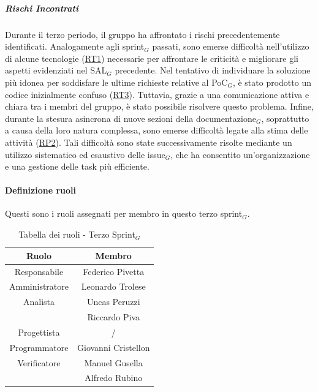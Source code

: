 \documentclass[10pt]{article}
\begin{document}
{{{{    \subparagraph*{Rischi Incontrati}\mbox{}

    Durante il terzo periodo, il gruppo ha affrontato i rischi precedentemente identificati. Analogamente agli sprint$_G$ passati, sono emerse difficoltà nell'utilizzo di alcune tecnologie (\hyperref[RT1]{RT1}) necessarie per affrontare le criticità e migliorare gli aspetti evidenziati nel SAL$_G$ precedente. Nel tentativo di individuare la soluzione più idonea per soddisfare le ultime richieste relative al PoC$_G$, è stato prodotto un codice inizialmente confuso (\hyperref[RT3]{RT3}). Tuttavia, grazie a una comunicazione attiva e chiara tra i membri del gruppo, è stato possibile risolvere questo problema.
    Infine, durante la stesura asincrona di nuove sezioni della documentazione$_G$, soprattutto a causa della loro natura complessa, sono emerse difficoltà legate alla stima delle attività (\hyperref[RP2]{RP2}). Tali difficoltà sono state successivamente risolte mediante un utilizzo sistematico ed esaustivo delle issue$_G$, che ha consentito un'organizzazione e una gestione delle task più efficiente.
    
    \paragraph{Definizione ruoli}\mbox{}\vspace{0.4em}
    
    Questi sono i ruoli assegnati per membro in questo terzo sprint$_G$.\\
    \begin{table}[H]
        \centering
        \begin{tabular}{|c|c|}
        \hline
        \rowcolor{gray!25}
        \textbf{Ruolo} & \textbf{Membro}\\
        \hline
        Responsabile & Federico Pivetta\\
        \hline
        Amministratore & Leonardo Trolese\\ 
        \hline
        Analista & Uncas Peruzzi\\
        & Riccardo Piva\\
        \hline
        Progettista & / \\
        \hline
        Programmatore & Giovanni Cristellon \\
        \hline
        Verificatore & Manuel Gusella\\
        & Alfredo Rubino\\
        \hline
        \end{tabular}
        \caption{Tabella dei ruoli - Terzo Sprint$_G$}
    \end{table}

}}}}
\end{document}
